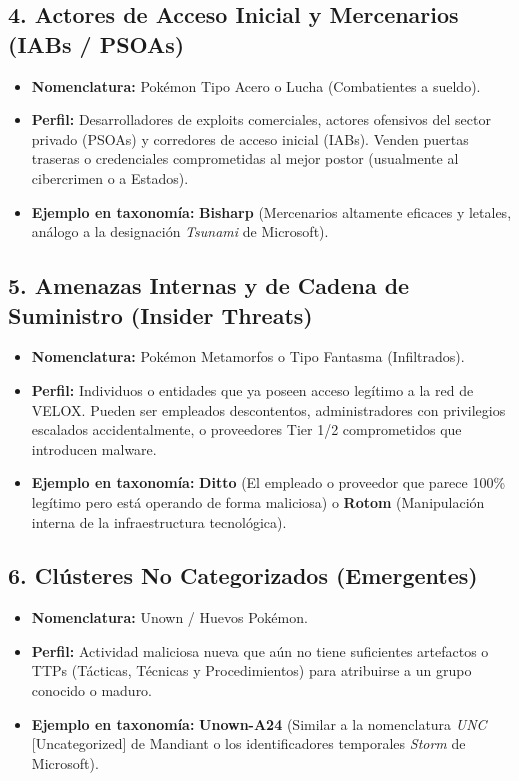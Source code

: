 \documentclass[letterpaper,11pt]{article}
\begin{document}
\subsection{4. Actores de Acceso Inicial y Mercenarios (IABs / PSOAs)}
\begin{itemize}
    \item \textbf{Nomenclatura:} Pokémon Tipo Acero o Lucha (Combatientes a sueldo).
    \item \textbf{Perfil:} Desarrolladores de exploits comerciales, actores ofensivos del sector privado (PSOAs) y corredores de acceso inicial (IABs). Venden puertas traseras o credenciales comprometidas al mejor postor (usualmente al cibercrimen o a Estados).
    \item \textbf{Ejemplo en taxonomía:} \textbf{Bisharp} (Mercenarios altamente eficaces y letales, análogo a la designación \textit{Tsunami} de Microsoft).
\end{itemize}

\subsection{5. Amenazas Internas y de Cadena de Suministro (Insider Threats)}
\begin{itemize}
    \item \textbf{Nomenclatura:} Pokémon Metamorfos o Tipo Fantasma (Infiltrados).
    \item \textbf{Perfil:} Individuos o entidades que ya poseen acceso legítimo a la red de VELOX. Pueden ser empleados descontentos, administradores con privilegios escalados accidentalmente, o proveedores Tier 1/2 comprometidos que introducen malware.
    \item \textbf{Ejemplo en taxonomía:} \textbf{Ditto} (El empleado o proveedor que parece 100\% legítimo pero está operando de forma maliciosa) o \textbf{Rotom} (Manipulación interna de la infraestructura tecnológica).
\end{itemize}

\subsection{6. Clústeres No Categorizados (Emergentes)}
\begin{itemize}
    \item \textbf{Nomenclatura:} Unown / Huevos Pokémon.
    \item \textbf{Perfil:} Actividad maliciosa nueva que aún no tiene suficientes artefactos o TTPs (Tácticas, Técnicas y Procedimientos) para atribuirse a un grupo conocido o maduro.
    \item \textbf{Ejemplo en taxonomía:} \textbf{Unown-A24} (Similar a la nomenclatura \textit{UNC} [Uncategorized] de Mandiant o los identificadores temporales \textit{Storm} de Microsoft).
\end{itemize}
\end{document}
